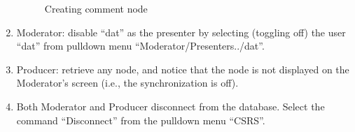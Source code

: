 \begin{enumerate}
\begin{figure}[htb]
  {\centerline{}}
  \caption{Creating comment node}
  \label{orientation-comment}
\end{figure}

 \item Moderator: disable ``dat'' as the presenter by
 selecting (toggling off) the  user ``dat'' from pulldown menu
 ``Moderator/Presenters../dat''. 
 \item Producer: retrieve any node, and notice that the node is not
 displayed on the Moderator's screen (i.e., the synchronization is
 off).  
\item Both Moderator and Producer disconnect from the database.
Select the command ``Disconnect'' from the pulldown menu ``CSRS''.
 \end{enumerate}


